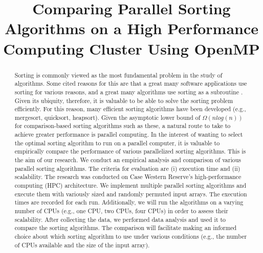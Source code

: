 \documentclass[conference]{IEEEtran}
\begin{document}
		\title{Comparing Parallel Sorting Algorithms on a High Performance Computing Cluster Using OpenMP}
			\author{
			\and
			\and
			\and
			}
	\maketitle
	
\begin{abstract}
Sorting is commonly viewed as the most fundamental problem in the study of algorithms. Some cited reasons for this are that a great many software applications use sorting for various reasons, and a great many algorithms use sorting as a subroutine \cite{cormen_introduction_2009}. 
Given its ubiquity, therefore, it is valuable to be able to solve the sorting problem efficiently. 
For this reason, many efficient sorting algorithms have been developed (e.g., mergesort, quicksort, heapsort). 
Given the asymptotic lower bound of $\Omega(nlog(n))$ for comparison-based sorting algorithms such as these, a natural route to take to achieve greater performance is parallel computing. 
In the interest of wanting to select the optimal sorting algorithm to run on a parallel computer, it is valuable to empirically compare the performance of various parallelized sorting algorithms. 
This is the aim of our research. 
We conduct an empirical analysis and comparison of various parallel sorting algorithms. 
The criteria for evaluation are (i) execution time and (ii) scalability. 
The research was conducted on Case Western Reserve’s high-performance computing (HPC) architecture. 
We implement multiple parallel sorting algorithms and execute them with variously sized and randomly permuted input arrays. The execution times are recorded for each run. 
Additionally, we will run the algorithms on a varying number of CPUs (e.g., one CPU, two CPUs, four CPUs) in order to assess their scalability.
After collecting the data, we performed data analysis and used it to compare the sorting algorithms. 
The comparison will facilitate making an informed choice about which sorting algorithm to use under various conditions (e.g., the number of CPUs available and the size of the input array).
\end{abstract}
\end{document}
